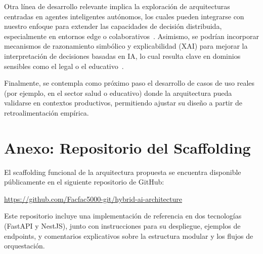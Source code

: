 \documentclass[a4paper]{llncs}
\begin{document}
Otra línea de desarrollo relevante implica la exploración de arquitecturas centradas en agentes inteligentes autónomos, los cuales pueden integrarse con nuestro enfoque para extender las capacidades de decisión distribuida, especialmente en entornos edge o colaborativos~\cite{wooldridge2009multiagent}. Asimismo, se podrían incorporar mecanismos de razonamiento simbólico y explicabilidad (XAI) para mejorar la interpretación de decisiones basadas en IA, lo cual resulta clave en dominios sensibles como el legal o el educativo~\cite{arrieta2020explainable}.

Finalmente, se contempla como próximo paso el desarrollo de casos de uso reales (por ejemplo, en el sector salud o educativo) donde la arquitectura pueda validarse en contextos productivos, permitiendo ajustar su diseño a partir de retroalimentación empírica.


\appendix
\section*{Anexo: Repositorio del Scaffolding}

El scaffolding funcional de la arquitectura propuesta se encuentra disponible públicamente en el siguiente repositorio de GitHub:

\begin{center}
\url{https://github.com/Facfac5000-git/hybrid-ai-architecture}
\end{center}

Este repositorio incluye una implementación de referencia en dos tecnologías (FastAPI y NestJS), junto con instrucciones para su despliegue, ejemplos de endpoints, y comentarios explicativos sobre la estructura modular y los flujos de orquestación.
\end{document}
